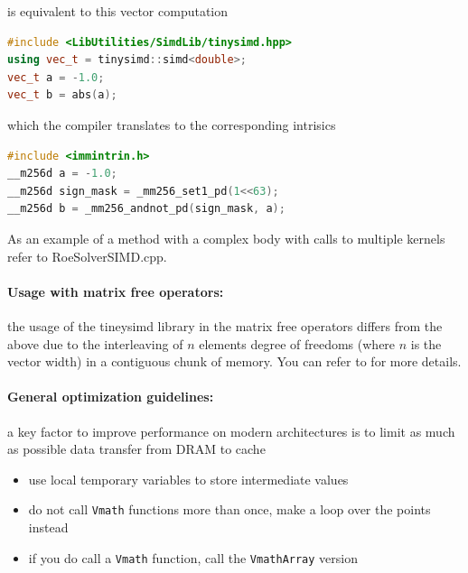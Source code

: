 is equivalent to this vector computation

\begin{lstlisting}[language=C++]
#include <LibUtilities/SimdLib/tinysimd.hpp>
using vec_t = tinysimd::simd<double>;
vec_t a = -1.0;
vec_t b = abs(a);
\end{lstlisting}

which the compiler translates to the corresponding intrisics

\begin{lstlisting}[language=C++]
#include <immintrin.h>
__m256d a = -1.0;
__m256d sign_mask = _mm256_set1_pd(1<<63);
__m256d b = _mm256_andnot_pd(sign_mask, a);
\end{lstlisting}

As an example of a method with a complex body with calls to multiple kernels refer to RoeSolverSIMD.cpp.

\paragraph{Usage with matrix free operators: }
the usage of the tineysimd library in the matrix free operators differs from the above due to the interleaving of $n$ elements degree of freedoms (where $n$ is the vector width) in a contiguous chunk of memory.
You can refer to \cite{moxey2020efficient} for more details.

\paragraph{General optimization guidelines: }
a key factor to improve performance on modern architectures is to limit as much as possible data transfer from DRAM to cache
\begin{itemize}
\item use local temporary variables to store intermediate values
\item do not call \verb+Vmath+ functions more than once, make a loop over the points instead
\item if you do call a \verb+Vmath+ function, call the \verb+VmathArray+ version

\end{itemize}
